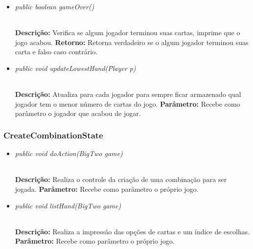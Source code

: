 \documentclass[12pt]{article}
\begin{document}
\vspace{0.2 true cm}

\begin{itemize}
\item \begin{large}\textit{public boolean gameOver()}\end{large}\\
\subitem \textbf{Descrição:} Verifica se algum jogador terminou suas cartas, imprime que o jogo acabou.
\subitem \textbf{Retorno:} Retorna verdadeiro se o algum jogador terminou suas carta e falso caso contrário.
\end{itemize}

\vspace{0.2 true cm}

\begin{itemize}
\item \begin{large}\textit{public void updateLowestHand(Player p)}\end{large}\\
\subitem \textbf{Descrição:} Atualiza para cada jogador para sempre ficar armazenado qual jogador tem o menor número de cartas do jogo.
\subitem \textbf{Parâmetro:} Recebe como parâmetro o jogador que acabou de jogar.
\end{itemize}

\vspace{0.2 true cm}

\subsubsection{CreateCombinationState}

\begin{itemize}
\item \begin{large}\textit{public void doAction(BigTwo game)}\end{large}\\
\subitem \textbf{Descrição:} Realiza o controle da criação de uma combinação para ser jogada.
\subitem \textbf{Parâmetro:} Recebe como parâmetro o próprio jogo.
\end{itemize}

\vspace{0.2 true cm}

\begin{itemize}
\item \begin{large}\textit{public void listHand(BigTwo game)}\end{large}\\
\subitem \textbf{Descrição:} Realiza a impressão das opções de cartas e um índice de escolhas.
\subitem \textbf{Parâmetro:} Recebe como parâmetro o próprio jogo.
\end{itemize}
\end{document}
